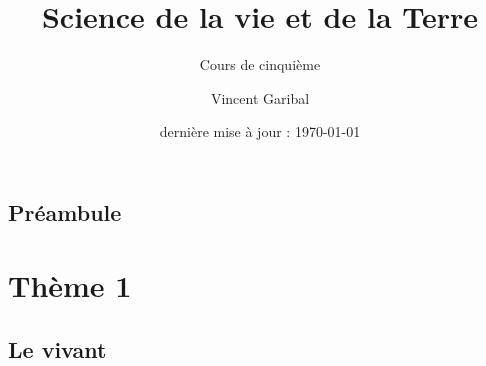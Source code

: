\documentclass{Cours}
\title{Science de la vie et de la Terre}
\subtitle{Cours de cinquième}
\author{Vincent Garibal}
\date{dernière mise à jour : \today}
\begin{document}
\frontmatter

\maketitle

\tableofcontents

\chapter{Préambule}

\mainmatter

\part{Thème 1}

\chapter{Le vivant}


\end{document}
